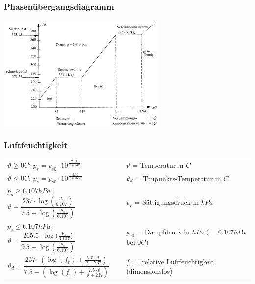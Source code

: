 		\begin{minipage}[t]{10cm}
			\subsubsection{Phasenübergangsdiagramm}
			\vspace{0.5cm}
			\vspace{-\ht\strutbox}\includegraphics[width=8.3cm]{./bilder/Phasenuebergangsdiagramm.png}
		\end{minipage}
		\vspace{1cm}
		\subsubsection{Luftfeuchtigkeit}
			\begin{minipage}[t]{13cm}
					\renewcommand{\arraystretch}{3}
					\begin{tabular}{ p{6.5cm} | p{9cm}}
						$\vartheta \geq 0 $\textdegree$ C$: \quad $p_s = p_{s0} \cdot 10^{\frac{7.5 \vartheta}{\vartheta +237}}$	&	$\vartheta$ = Temperatur in \textdegree $C$\\
						$\vartheta \leq 0 $\textdegree$ C$: \quad $p_s = p_{s0} \cdot 10^{\frac{9.5 \vartheta}{\vartheta +265.5}}$	&	$\vartheta_d$ = Taupunkts-Temperatur in \textdegree $C$\\
						$p_s \geq 6.107hPa$: \quad $\vartheta = \dfrac{237 \cdot \log{(\frac{p_s}{6.107})}}{7.5 - \log{(\frac{p_s}{6.107})}}$	&	$p_s$ = Sättigungsdruck in $hPa$\\
						$p_s \leq 6.107hPa$: \quad $\vartheta = \dfrac{265.5 \cdot \log{(\frac{p_s}{6.107}})}{9.5 - \log{(\frac{p_s}{6.107})}}$	&	$p_{s0}$ = Dampfdruck in $hPa$ $(= 6.107hPa$ bei $0 $\textdegree$ C)$\\
						$\vartheta_d = \dfrac{237 \cdot (\log{(f_r)} + \frac{7.5 \cdot \vartheta}{\vartheta +237})}{7.5 - (\log{(f_r)} + \frac{7.5 \cdot \vartheta}{\vartheta +237})}$	& $f_r$ = relative Luftfeuchtigkeit (dimensionslos)\\
					\end{tabular}
					\renewcommand{\arraystretch}{1}
			\end{minipage}

